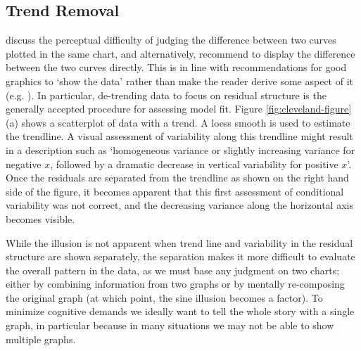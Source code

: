 \documentclass[11pt]{isuthesis}\usepackage[]{graphicx}\usepackage[]{color}
\begin{document}
\subsection{Trend Removal}
\citet{cleveland:1984, cleveland:1985} discuss the perceptual difficulty of judging the difference between two curves plotted in the same chart, and alternatively, recommend to display the difference between the two curves directly. This is in line with  recommendations  for good graphics to `show the data' rather than make the reader derive some aspect of it (e.g. \citet{wainer:2000}). In particular, de-trending data to focus on residual structure is the generally accepted procedure for assessing model fit. 
 Figure \ref{fig:cleveland-figure}(a) shows a scatterplot of data with a trend. A loess smooth is used to estimate the trendline. A visual assessment of variability along this trendline
might result in a description such as `homogeneous variance or slightly increasing variance for  negative $x$, followed by a dramatic decrease in vertical variability for positive $x$'.  
Once the residuals are separated from the trendline as shown on the right hand side of the figure, it becomes apparent that this first assessment of conditional variability was not correct, and the decreasing variance along the horizontal axis becomes visible.
 
While the illusion is not apparent when trend line and variability in the  residual structure are shown separately, the separation 
makes it  more difficult to evaluate the overall  pattern in the data, as we  must base any judgment on two charts; either by combining information from two graphs or by mentally re-composing the original graph (at which point, the sine illusion becomes a factor). To minimize cognitive demands we ideally want to tell the whole story with a single graph, in particular because in many situations we may not be able to show multiple graphs. 
\end{document}
